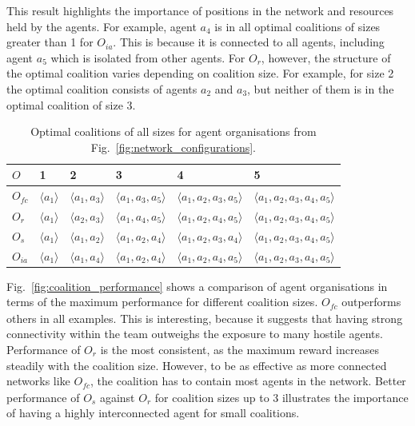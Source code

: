 \documentclass{llncs}
\newcommand{\LD}{\langle}
\newcommand{\RD}{\rangle}
\begin{document}
This result highlights the importance of positions in the network and resources held by the agents.
For example, agent $a_4$ is in all optimal coalitions of sizes greater than 1 for $O_{ia}$.
This is because it is connected to all agents, including agent $a_5$ which is isolated from other agents.
For $O_r$, however, the structure of the optimal coalition varies depending on coalition size. For example, for size 2 the optimal coalition consists of agents $a_2$ and $a_3$, but neither of them is in the optimal coalition of size 3.

\begin{table}
 \centering
 \begin{tabular}{ | l | l | l | l | l | l |}
    \hline
    $O$ & 1& 2 & 3 & 4 & 5 \\ \hline
    $O_{\mathit{fc}}$ & $\LD a_1 \RD$ & $\LD a_1, a_3 \RD$ & $\LD a_1, a_3, a_5 \RD$ & $\LD a_1, a_2, a_3, a_5 \RD$  & $\LD a_1, a_2, a_3, a_4, a_5 \RD$ \\ \hline
    $O_r$ & $\LD a_1 \RD$  & $\LD a_2, a_3 \RD$ & $\LD a_1, a_4, a_5 \RD$ & $\LD a_1, a_2, a_4, a_5 \RD$  & $\LD a_1, a_2, a_3, a_4, a_5 \RD$ \\ \hline
    $O_s$ & $\LD a_1 \RD$  & $\LD a_1, a_2 \RD$ & $\LD a_1, a_2, a_4 \RD$ & $\LD a_1, a_2, a_3, a_4 \RD$  & $\LD a_1, a_2, a_3, a_4, a_5 \RD$ \\ \hline
    $O_{ia}$ & $\LD a_1 \RD$  & $\LD a_1, a_4 \RD$ & $\LD a_1, a_2, a_4 \RD$ & $\LD a_1, a_2, a_4, a_5 \RD$  & $\LD a_1, a_2, a_3, a_4, a_5 \RD$ \\ \hline
\end{tabular}
\vspace{+2pt}
\caption{Optimal coalitions of all sizes for agent organisations from Fig.~\ref{fig:network_configurations}.}
\label{tab:optimal_coalitions}
\end{table}

Fig.~\ref{fig:coalition_performance} shows a comparison of agent organisations in terms of the maximum performance for different coalition sizes. $O_{\mathit{fc}}$ outperforms others in all examples. This is interesting, because it suggests that having strong connectivity within the team outweighs the exposure to many hostile agents. Performance of $O_r$ is the most consistent, as the maximum reward increases steadily with the coalition size.
However, to be as effective as more connected networks like $O_{\mathit{fc}}$, the coalition has to contain most agents in the network. Better performance of $O_s$ against $O_r$ for coalition sizes up to 3 illustrates the importance of having a highly interconnected agent for small coalitions.
\end{document}
